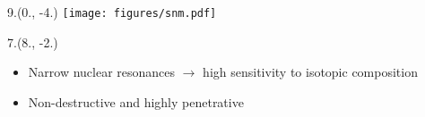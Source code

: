 \begin{textblock}{9.}(0., -4.)
    \texttt{[image: figures/snm.pdf]}
\end{textblock}

\begin{textblock}{7.}(8., -2.)
    \begin{itemize}
        \item Narrow nuclear resonances $\to$ high sensitivity to isotopic composition
        \item Non-destructive and highly penetrative
    \end{itemize}
\end{textblock}